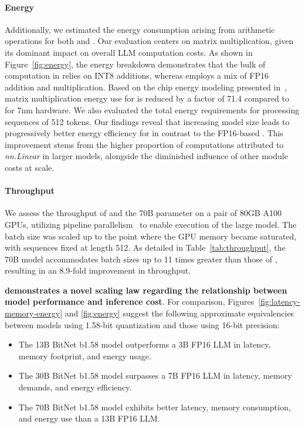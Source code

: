 \paragraph{Energy}

Additionally, we estimated the energy consumption arising from arithmetic operations for both  and . Our evaluation centers on matrix multiplication, given its dominant impact on overall LLM computation costs. As shown in Figure~\ref{fig:energy}, the energy breakdown demonstrates that the bulk of computation in  relies on INT8 additions, whereas  employs a mix of FP16 addition and multiplication. Based on the chip energy modeling presented in~\cite{energycost, pokebnn}, matrix multiplication energy use for  is reduced by a factor of 71.4 compared to  for 7nm hardware. We also evaluated the total energy requirements for processing sequences of 512 tokens. Our findings reveal that increasing model size leads to progressively better energy efficiency for  in contrast to the FP16-based . This improvement stems from the higher proportion of computations attributed to \emph{nn.Linear} in larger models, alongside the diminished influence of other module costs at scale.

\paragraph{Throughput}

We assess the throughput of  and the 70B parameter  on a pair of 80GB A100 GPUs, utilizing pipeline parallelism~\cite{gpipe} to enable execution of the large  model. The batch size was scaled up to the point where the GPU memory became saturated, with sequences fixed at length 512. As detailed in Table~\ref{tab:throughput}, the 70B  model accommodates batch sizes up to 11 times greater than those of , resulting in an 8.9-fold improvement in throughput.

\textbf{ demonstrates a novel scaling law regarding the relationship between model performance and inference cost}. For comparison, Figures~\ref{fig:latency-memory-energy} and \ref{fig:energy} suggest the following approximate equivalencies between models using 1.58-bit quantization and those using 16-bit precision:

\begin{itemize}
    \item The 13B BitNet b1.58 model outperforms a 3B FP16 LLM in latency, memory footprint, and energy usage.
    \item The 30B BitNet b1.58 model surpasses a 7B FP16 LLM in latency, memory demands, and energy efficiency.
    \item The 70B BitNet b1.58 model exhibits better latency, memory consumption, and energy use than a 13B FP16 LLM.
\end{itemize}

